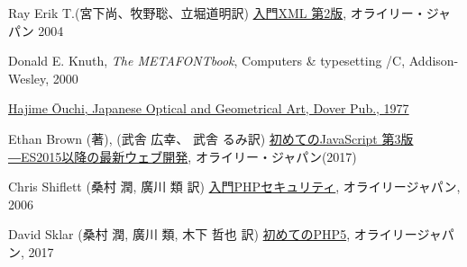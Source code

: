 \begin{thebibliography}{99}
\iffalse
 \bibitem{SVGECMAScript}
\href{http://www.w3.org/TR/SVG11/ecmascript-binding.html}
      {ECMAScript Language Binding for SVG}, \newline
      {\texttt{http://www.w3.org/TR/SVG11/ecmascript-binding.html}}
\fi

  Ray Erik T.(宮下尚、牧野聡、立堀道明訳)
\href{http://www.amazon.co.jp/exec/obidos/ASIN/4873111846/qid=1144562915/sr=1-19/br_lfbnb_b_19/503-6113071-5894369}{入門XML 第2版}, オライリー・ジャパン 2004
\iffalse
 \bibitem{JQUERY}jQuery Community Experts (株式会社クイープ 訳), \href{http://www.amazon.co.jp/jQuery%E3%82%AF%E3%83%83%E3%82%AF%E3%83%96%E3%83%83%E3%82%AF-jQuery-Community-Experts/dp/4873114683/ref=sr_1_4?ie=UTF8&qid=1304690839&sr=8-4g}
{jQueryクックブック}, オライリージャパン, 2010 
\fi
  Donald E. Knuth, {\it The METAFONTbook}, Computers \&
	typesetting /C, Addison-Wesley, 2000

\href{http://www.amazon.co.jp/Japanese-Optical-Geometrical-Pictorial-Archives/dp/048623553X/ref=sr_1_8?ie=UTF8&s=english-books&qid=1206946932&sr=8-8}
{Hajime \=Ouchi, Japanese Optical and Geometrical Art, Dover Pub., 1977 }

Ethan Brown (著), (武舎 広幸、 武舎 るみ訳) 
\href{https://www.amazon.co.jp/%E5%88%9D%E3%82%81%E3%81%A6%E3%81%AEJavaScript-%E7%AC%AC3%E7%89%88-%E2%80%95ES2015%E4%BB%A5%E9%99%8D%E3%81%AE%E6%9C%80%E6%96%B0%E3%82%A6%E3%82%A7%E3%83%96%E9%96%8B%E7%99%BA-Ethan-Brown/dp/4873117836}
{初めてのJavaScript 第3版 ―ES2015以降の最新ウェブ開発}, オライリー・ジャパン(2017)
\iffalse
 \bibitem{Robinson}J. O. Robinson, {\it The Psychology of Visual
	 Illusion}, Dover, N. Y., 1998(originally published in 1972)
\fi
 Chris Shiflett (桑村 潤, 廣川 類 訳)
\href{http://www.amazon.co.jp/入門PHPセキュリティ-クリス-シフレット/dp/4873112869/ref=sr_1_2?ie=UTF8&s=books&qid=1208069132&sr=1-2}
     {入門PHPセキュリティ}, オライリージャパン, 2006

 David Sklar (桑村 潤, 廣川 類, 木下 哲也 訳)
\href{https://www.amazon.co.jp/%E5%88%9D%E3%82%81%E3%81%A6%E3%81%AEPHP-David-Sklar/dp/4873117933/ref=pd_sim_14_3?_encoding=UTF8&psc=1&refRID=E7D810BFS7XPWNDEQ4K5}
	 {初めてのPHP5}, オライリージャパン, 2017


\end{thebibliography}
